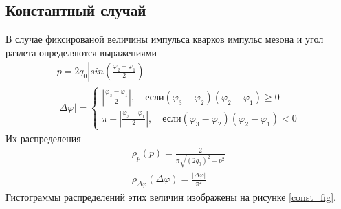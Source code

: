\documentclass[12pt]{article}
\renewcommand{\l}{\left( }
\renewcommand{\r}{\right) }
\renewcommand{\phi}{\varphi}
\newcommand{\br}[1]{\l {#1} \r}
\newcommand{\abs}[1]{\left| #1 \right|}
\begin{document}
\subsection{Константный случай}
В случае фиксированой величины импульса кварков импульс мезона и угол разлета определяются выражениями
\begin{eqnarray}
p =  2 q_0 \left|{sin \br{\frac{\phi_2 - \phi_1}{2}}}\right| \\
\abs{\Delta \phi} = 
\begin{cases}
\abs{\frac{\phi_3 - \phi_1}{2}},\quad \text{если} \br{\phi_3 -\phi_2} \br{\phi_2 -\phi_1} \ge 0 \\
\pi - \abs{\frac{\phi_3 - \phi_1}{2}},\quad \text{если} \br{\phi_3 -\phi_2} \br{\phi_2 -\phi_1} < 0
\end{cases}
\end{eqnarray}
Их распределения
\begin{eqnarray}
\rho_p \br{p} = \frac{2}{\pi\sqrt{\br{2 q_0}^2 -p^2}} \\
\rho_{\Delta \phi} \br{\Delta \phi} = \frac{\abs{\Delta \phi}}{\pi^2}
\end{eqnarray}
Гистограммы распределений этих величин изображены на рисунке \ref{const_fig}.
\end{document}
